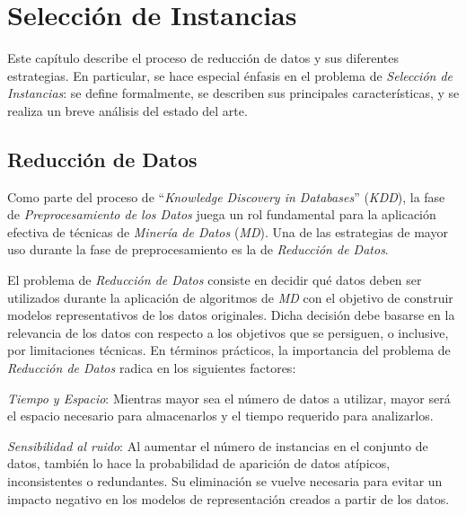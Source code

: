 \chapter{Selección de Instancias}
\label{capitulo1}

Este capítulo describe el proceso de reducción de datos y sus diferentes estrategias. En particular, se hace especial énfasis en el problema de \emph{Selección de Instancias}: se define formalmente, se describen sus principales características, y se realiza un breve análisis del estado del arte.%

\section{Reducción de Datos}

Como parte del proceso de ``\emph{Knowledge Discovery in Databases}'' (\emph{KDD}), la fase de \emph{Preprocesamiento de los Datos} juega un rol fundamental para la aplicación efectiva de técnicas de \emph{Minería de Datos} (\emph{MD}). Una de las estrategias de mayor uso durante la fase de preprocesamiento es la de \emph{Reducción de Datos}.

El problema de \emph{Reducción de Datos} consiste en decidir qué datos deben ser utilizados durante la aplicación de algoritmos de \emph{MD} con el objetivo de construir modelos representativos de los datos originales. Dicha decisión debe basarse en la relevancia de los datos con respecto a los objetivos que se persiguen, o inclusive, por limitaciones técnicas. En términos prácticos, la importancia del problema de \emph{Reducción de Datos} radica en los siguientes factores:
\begin{inparaenum}
\item \textit{Tiempo y Espacio}: Mientras mayor sea el número de datos a utilizar, mayor será el espacio necesario para almacenarlos y el tiempo requerido para analizarlos. 
\item \textit{Sensibilidad al ruido}: Al aumentar el número de instancias en el conjunto de datos, también lo hace la probabilidad de aparición de datos atípicos, inconsistentes o redundantes. Su eliminación se vuelve necesaria para evitar un impacto negativo en los modelos de representación creados a partir de los datos.
\end{inparaenum}

